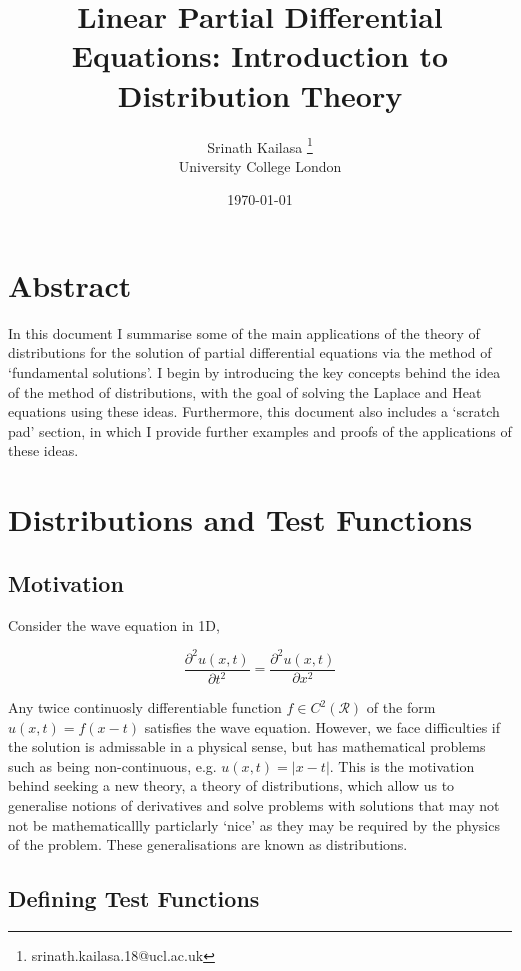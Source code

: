 \documentclass[12pt, a4]{article}
\title{Linear Partial Differential Equations: Introduction to Distribution Theory}
\author{Srinath Kailasa \thanks{srinath.kailasa.18@ucl.ac.uk} \\ \small University College London}
\date{\today}
\begin{document}
\maketitle

\section*{Abstract}

In this document I summarise some of the main applications of the theory of distributions for the solution of partial differential equations via the method of `fundamental solutions'. I begin by introducing the key concepts behind the idea of the method of distributions, with the goal of solving the Laplace and Heat equations using these ideas. Furthermore, this document also includes a `scratch pad' section, in which I provide further examples and proofs of the applications of these ideas.

\section{Distributions and Test Functions}

\subsection{Motivation}

Consider the wave equation in 1D,

\begin{equation}
    \frac{\partial^2u(x, t)}{\partial t^2} = \frac{\partial^2u(x, t)}{\partial x^2}
    \label{eq:wave_eq_1d}
\end{equation}

Any twice continuosly differentiable function $f \in C^2(\mathcal{R})$ of the form $u(x, t) = f(x-t)$ satisfies the wave equation. However, we face difficulties if the solution is admissable in a physical sense, but has mathematical problems such as being non-continuous, e.g. $u(x, t) = |x-t|$. This is the motivation behind seeking a new theory, a theory of distributions, which allow us to generalise notions of derivatives and solve problems with solutions that may not not be mathematicallly particlarly `nice' as they may be required by the physics of the problem. These generalisations are known as distributions.

\subsection{Defining Test Functions}
\end{document}
